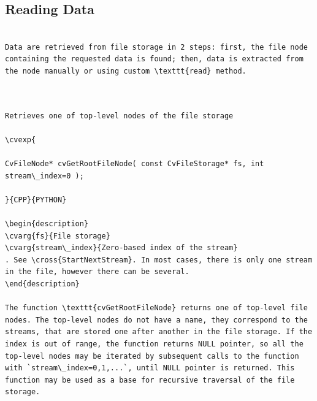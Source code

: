 \subsection{Reading Data}
\begin{verbatim}

Data are retrieved from file storage in 2 steps: first, the file node containing the requested data is found; then, data is extracted from the node manually or using custom \texttt{read} method.


\end{verbatim}
\label{GetRootFileNode}
\begin{verbatim}

Retrieves one of top-level nodes of the file storage

\cvexp{

CvFileNode* cvGetRootFileNode( const CvFileStorage* fs, int stream\_index=0 );

}{CPP}{PYTHON}

\begin{description}
\cvarg{fs}{File storage}
\cvarg{stream\_index}{Zero-based index of the stream}
. See \cross{StartNextStream}. In most cases, there is only one stream in the file, however there can be several.
\end{description}

The function \texttt{cvGetRootFileNode} returns one of top-level file nodes. The top-level nodes do not have a name, they correspond to the streams, that are stored one after another in the file storage. If the index is out of range, the function returns NULL pointer, so all the top-level nodes may be iterated by subsequent calls to the function with `stream\_index=0,1,...`, until NULL pointer is returned. This function may be used as a base for recursive traversal of the file storage.


\end{verbatim}
\label{GetFileNodeByName}
